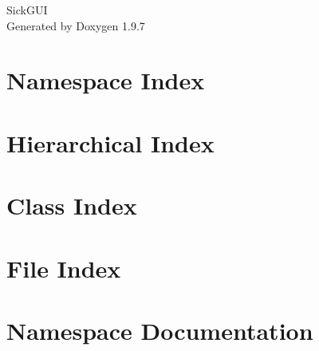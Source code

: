\documentclass[twoside]{book}
\newcommand{\+}{\discretionary{\mbox{\scriptsize$\hookleftarrow$}}{}{}}
\newcommand{\clearemptydoublepage}{%
    \newpage{\pagestyle{empty}\cleardoublepage}%
  }
\begin{document}
  \raggedbottom
    \hypersetup{pageanchor=false,
                bookmarksnumbered=true,
                pdfencoding=unicode
               }
  \begin{titlepage}
  \vspace*{7cm}
  \begin{center}%
  {\Large Sick\+GUI}\\
  \vspace*{1cm}
  {\large Generated by Doxygen 1.9.7}\\
  \end{center}
  \end{titlepage}
  \clearemptydoublepage
  \tableofcontents
  \clearemptydoublepage
  \hypersetup{pageanchor=true}
\chapter{Namespace Index}

\chapter{Hierarchical Index}

\chapter{Class Index}

\chapter{File Index}

\chapter{Namespace Documentation}

\end{document}
